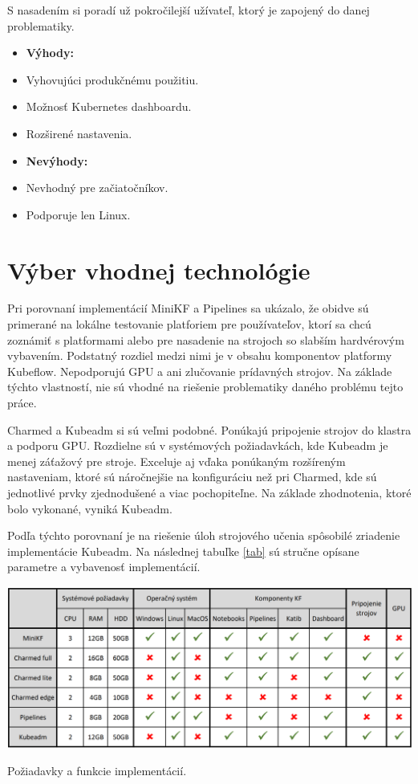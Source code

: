 S nasadením si poradí už pokročilejší užívateľ, ktorý je zapojený do danej problematiky.
\newline
\newline
\begin{minipage}[t]{.55\textwidth}
    \begin{itemize}
        \item []\textbf{Výhody:}
        \item Vyhovujúci produkčnému použitiu.
	    \item Možnosť Kubernetes dashboardu.
        \item Rozširené nastavenia.
    \end{itemize}
\end{minipage}%
\begin{minipage}[t]{.45\textwidth}
    \begin{itemize}
        \item []\textbf{Nevýhody:}
        \item Nevhodný pre začiatočníkov.
	    \item Podporuje len Linux.
    \end{itemize}
\end{minipage}

\section{Výber vhodnej technológie}

Pri porovnaní implementácií MiniKF a Pipelines sa ukázalo, že obidve sú primerané na lokálne testovanie platforiem pre používateľov, ktorí sa chcú zoznámiť s platformami alebo pre nasadenie na strojoch so slabším hardvérovým vybavením. Podstatný rozdiel medzi nimi je v obsahu komponentov platformy Kubeflow. Nepodporujú GPU a ani zlučovanie prídavných strojov. Na základe týchto vlastností, nie sú vhodné na riešenie problematiky daného problému tejto práce.

Charmed a Kubeadm si sú veľmi podobné. Ponúkajú pripojenie strojov do klastra a podporu GPU. Rozdielne sú v systémových požiadavkách, kde Kubeadm je menej záťažový pre stroje. Exceluje aj vďaka ponúkaným rozšíreným nastaveniam, ktoré sú náročnejšie na konfiguráciu než pri Charmed, kde sú jednotlivé prvky zjednodušené a viac pochopiteľne. Na základe zhodnotenia, ktoré bolo vykonané, vyniká Kubeadm.

Podľa týchto porovnaní je na riešenie úloh strojového učenia spôsobilé zriadenie implementácie Kubeadm. Na následnej tabuľke \ref{tab} sú stručne opísane parametre a vybavenosť implementácií.

\begin{table}[!h]
    \centering
    \includegraphics[width=1\linewidth]{figures/table}
    \caption{Požiadavky a funkcie implementácií.}
    \label{tab}
\end{table}